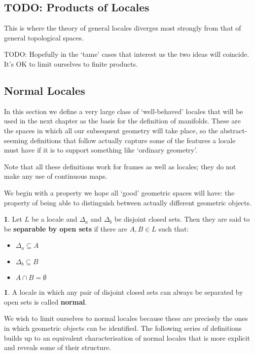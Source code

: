 \documentclass[oneside,english]{amsbook}
\numberwithin{section}{chapter}
\theoremstyle{plain}
\theoremstyle{definition}
\newtheorem{defn}[thm]{\protect\definitionname}
\providecommand{\definitionname}{Definition}
\begin{document}
\subsection{TODO: Products of Locales}

This is where the theory of general locales diverges most strongly from that of general topological spaces. 

TODO: Hopefully in the `tame' cases that interest us the two ideas will coincide. It's OK to limit ourselves to finite products.


\subsection{Normal Locales}

In this section we define a very large class of `well-behaved' locales that will be used in the next chapter as the basis for the definition of manifolds. These are the spaces in which all our subsequent geometry will take place, so the abstract-seeming definitions that follow actually capture some of the features a locale must have if it is to support something like `ordinary geometry'.

Note that all these definitions work for frames as well as locales; they do not make any use of continuous maps. 

We begin with a property we hope all `good' geometric spaces will have: the property of being able to distinguish between actually different geometric objects. 

\begin{defn}
	Let $L$ be a locale and $\Delta_a$ and $\Delta_b$ be disjoint closed sets. Then they are said to be \textbf{separable by open sets} if there are $A, B\in L$ such that:\begin{itemize}
		\item $\Delta_a \subseteq A$
		\item $\Delta_b \subseteq B$
		\item $A\cap B = \emptyset$
	\end{itemize}
\end{defn}

\begin{defn}
	A locale in which any pair of disjoint closed sets can always be separated by open sets is called \textbf{normal}.
\end{defn}

We wish to limit ourselves to normal locales because these are precisely the ones in which geometric objects can be identified. The following series of definitions builds up to an equivalent characterisation of normal locales that is more explicit and reveals some of their structure.
\end{document}
